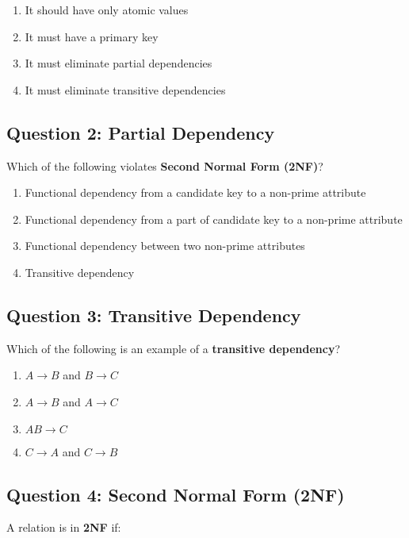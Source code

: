 \begin{enumerate}[label=(\alph*)]
    \item It should have only atomic values
    \item It must have a primary key
    \item It must eliminate partial dependencies
    \item It must eliminate transitive dependencies
\end{enumerate}

\vspace{1em}

\subsection*{Question 2: Partial Dependency}
Which of the following violates \textbf{Second Normal Form (2NF)}?

\begin{enumerate}[label=(\alph*)]
    \item Functional dependency from a candidate key to a non-prime attribute
    \item Functional dependency from a part of candidate key to a non-prime attribute
    \item Functional dependency between two non-prime attributes
    \item Transitive dependency
\end{enumerate}

\vspace{1em}

\subsection*{Question 3: Transitive Dependency}
Which of the following is an example of a \textbf{transitive dependency}?

\begin{enumerate}[label=(\alph*)]
    \item $A \rightarrow B$ and $B \rightarrow C$
    \item $A \rightarrow B$ and $A \rightarrow C$
    \item $AB \rightarrow C$
    \item $C \rightarrow A$ and $C \rightarrow B$
\end{enumerate}

\vspace{1em}

\subsection*{Question 4: Second Normal Form (2NF)}
A relation is in \textbf{2NF} if:

